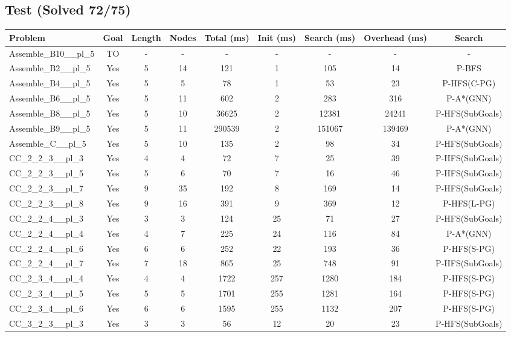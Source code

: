 \documentclass{article}
\begin{document}
\subsection*{Test (Solved 72/75)}
\begin{tabular}{lcccccccc}
\toprule
Problem & Goal & Length & Nodes & Total (ms) & Init (ms) & Search (ms) & Overhead (ms) & Search \\
\midrule
Assemble\_B10\_\_pl\_5 & TO & - & - & - & - & - & - & - \\
Assemble\_B2\_\_pl\_5 & Yes & 5 & 14 & 121 & 1 & 105 & 14 & P-BFS \\
Assemble\_B4\_\_pl\_5 & Yes & 5 & 5 & 78 & 1 & 53 & 23 & P-HFS(C-PG) \\
Assemble\_B6\_\_pl\_5 & Yes & 5 & 11 & 602 & 2 & 283 & 316 & P-A*(GNN) \\
Assemble\_B8\_\_pl\_5 & Yes & 5 & 10 & 36625 & 2 & 12381 & 24241 & P-HFS(SubGoals) \\
Assemble\_B9\_\_pl\_5 & Yes & 5 & 11 & 290539 & 2 & 151067 & 139469 & P-A*(GNN) \\
Assemble\_C\_\_pl\_5 & Yes & 5 & 10 & 135 & 2 & 98 & 34 & P-HFS(SubGoals) \\
CC\_2\_2\_3\_\_pl\_3 & Yes & 4 & 4 & 72 & 7 & 25 & 39 & P-HFS(SubGoals) \\
CC\_2\_2\_3\_\_pl\_5 & Yes & 5 & 6 & 70 & 7 & 16 & 46 & P-HFS(SubGoals) \\
CC\_2\_2\_3\_\_pl\_7 & Yes & 9 & 35 & 192 & 8 & 169 & 14 & P-HFS(SubGoals) \\
CC\_2\_2\_3\_\_pl\_8 & Yes & 9 & 16 & 391 & 9 & 369 & 12 & P-HFS(L-PG) \\
CC\_2\_2\_4\_\_pl\_3 & Yes & 3 & 3 & 124 & 25 & 71 & 27 & P-HFS(SubGoals) \\
CC\_2\_2\_4\_\_pl\_4 & Yes & 4 & 7 & 225 & 24 & 116 & 84 & P-A*(GNN) \\
CC\_2\_2\_4\_\_pl\_6 & Yes & 6 & 6 & 252 & 22 & 193 & 36 & P-HFS(S-PG) \\
CC\_2\_2\_4\_\_pl\_7 & Yes & 7 & 18 & 865 & 25 & 748 & 91 & P-HFS(SubGoals) \\
CC\_2\_3\_4\_\_pl\_4 & Yes & 4 & 4 & 1722 & 257 & 1280 & 184 & P-HFS(S-PG) \\
CC\_2\_3\_4\_\_pl\_5 & Yes & 5 & 5 & 1701 & 255 & 1281 & 164 & P-HFS(S-PG) \\
CC\_2\_3\_4\_\_pl\_6 & Yes & 6 & 6 & 1595 & 255 & 1132 & 207 & P-HFS(S-PG) \\
CC\_3\_2\_3\_\_pl\_3 & Yes & 3 & 3 & 56 & 12 & 20 & 23 & P-HFS(SubGoals) \\

\end{tabular}
\end{document}
